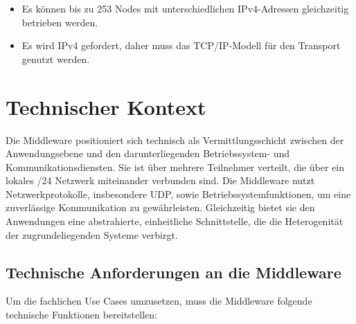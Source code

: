 \begin{itemize}
	\item Es können bis zu 253 Nodes mit unterschiedlichen IPv4-Adressen gleichzeitig betrieben werden.
	\item Es wird IPv4 gefordert, daher muss das TCP/IP-Modell für den Transport genutzt werden. 
\end{itemize}

\section{Technischer Kontext}

Die Middleware positioniert sich technisch als Vermittlungsschicht zwischen der Anwendungsebene und den darunterliegenden Betriebssystem- und Kommunikationsdiensten. Sie ist über mehrere Teilnehmer verteilt, die über ein lokales /24 Netzwerk miteinander verbunden sind.
Die Middleware nutzt Netzwerkprotokolle, insbesondere UDP, sowie Betriebssystemfunktionen, um eine zuverlässige Kommunikation zu gewährleisten. Gleichzeitig bietet sie den Anwendungen eine abstrahierte, einheitliche Schnittstelle, die die Heterogenität der zugrundeliegenden Systeme verbirgt.

\subsection{Technische Anforderungen an die Middleware}

Um die fachlichen Use Cases umzusetzen, muss die Middleware folgende technische Funktionen bereitstellen:

